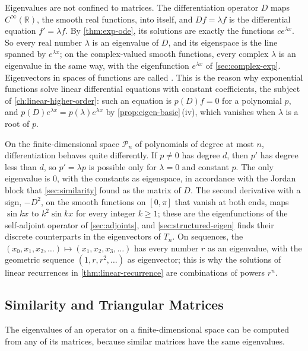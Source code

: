 Eigenvalues are not confined to matrices. The differentiation operator $D$ maps $C^\infty(\mathbb R)$, the smooth real functions, into itself, and $Df=\lambda f$ is the differential equation $f'=\lambda f$. By \cref{thm:exp-ode}, its solutions are exactly the functions $ce^{\lambda x}$. So every real number $\lambda$ is an eigenvalue of $D$, and its eigenspace is the line spanned by $e^{\lambda x}$; on the complex-valued smooth functions, every complex $\lambda$ is an eigenvalue in the same way, with the eigenfunction $e^{\lambda x}$ of \cref{sec:complex-exp}. Eigenvectors in spaces of functions are called . This is the reason why exponential functions solve linear differential equations with constant coefficients, the subject of \cref{ch:linear-higher-order}: such an equation is $p(D)f=0$ for a polynomial $p$, and $p(D)e^{\lambda x}=p(\lambda)e^{\lambda x}$ by \cref{prop:eigen-basic}\,(iv), which vanishes when $\lambda$ is a root of $p$.

On the finite-dimensional space $\mathcal P_n$ of polynomials of degree at most $n$, differentiation behaves quite differently. If $p\ne0$ has degree $d$, then $p'$ has degree less than $d$, so $p'=\lambda p$ is possible only for $\lambda=0$ and constant $p$. The only eigenvalue is $0$, with the constants as eigenspace, in accordance with the Jordan block that \cref{sec:similarity} found as the matrix of $D$. The second derivative with a sign, $-D^2$, on the smooth functions on $[0,\pi]$ that vanish at both ends, maps $\sin kx$ to $k^2\sin kx$ for every integer $k\ge1$; these are the eigenfunctions of the self-adjoint operator of \cref{sec:adjoints}, and \cref{sec:structured-eigen} finds their discrete counterparts in the eigenvectors of $T_n$. On sequences, the  $(x_0,x_1,x_2,\ldots)\mapsto(x_1,x_2,x_3,\ldots)$ has every number $r$ as an eigenvalue, with the geometric sequence $(1,r,r^2,\ldots)$ as eigenvector; this is why the solutions of linear recurrences in \cref{thm:linear-recurrence} are combinations of powers $r^n$.

\subsection{Similarity and Triangular Matrices}

The eigenvalues of an operator on a finite-dimensional space can be computed from any of its matrices, because similar matrices have the same eigenvalues.

